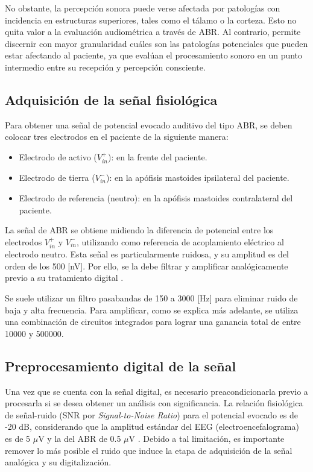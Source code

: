 No obstante, la percepción sonora puede verse afectada por patologías con incidencia en estructuras superiores, tales como el tálamo o la corteza. Esto no quita valor a la evaluación audiométrica a través de ABR. Al contrario, permite discernir con mayor granularidad cuáles son las patologías potenciales que pueden estar afectando al paciente, ya que evalúan el procesamiento sonoro en un punto intermedio entre su recepción y percepción consciente. 

\subsection{Adquisición de la señal fisiológica}

Para obtener una señal de potencial evocado auditivo del tipo ABR, se deben
colocar tres electrodos en el paciente de la siguiente manera:

\begin{itemize}
    \item Electrodo de activo ($V_{in}^{+}$): en la frente del paciente.
    \item Electrodo de tierra ($V_{in}^{-}$): en la apófisis mastoides ipsilateral del paciente.
    \item Electrodo de referencia (neutro): en la apófisis mastoides contralateral del paciente.
\end{itemize}

La señal de ABR se obtiene midiendo la diferencia de potencial entre los electrodos $V_{in}^{+}$ y $V_{in}^{-}$, utilizando como referencia de acoplamiento eléctrico al electrodo neutro. Esta señal es particularmente ruidosa, y su amplitud es del orden de los 500 [nV]. Por ello, se la debe filtrar y amplificar analógicamente previo a su tratamiento digital \cite{shojaeemend_automated_2018}.

Se suele utilizar un filtro pasabandas de 150 a 3000 [Hz] para eliminar ruido de baja y alta frecuencia. Para amplificar, como se explica más adelante, se utiliza una combinación de circuitos integrados para lograr una ganancia total de entre 10000 y 500000.

\subsection{Preprocesamiento digital de la señal}

Una vez que se cuenta con la señal digital, es necesario preacondicionarla previo a procesarla si se desea obtener un análisis con significancia. La relación fisiológica de señal-ruido (SNR por \textit{Signal-to-Noise Ratio}) para el potencial evocado es de -20 dB, considerando que la amplitud estándar del EEG (electroencefalograma) es de 5 $\mu$V \cite{young-ABR} y la del ABR de 0.5 $\mu$V  \cite{bhattacharyya-ABR}. Debido a tal limitación, es importante remover lo más posible el ruido que induce la etapa de adquisición de la señal analógica y su digitalización.

